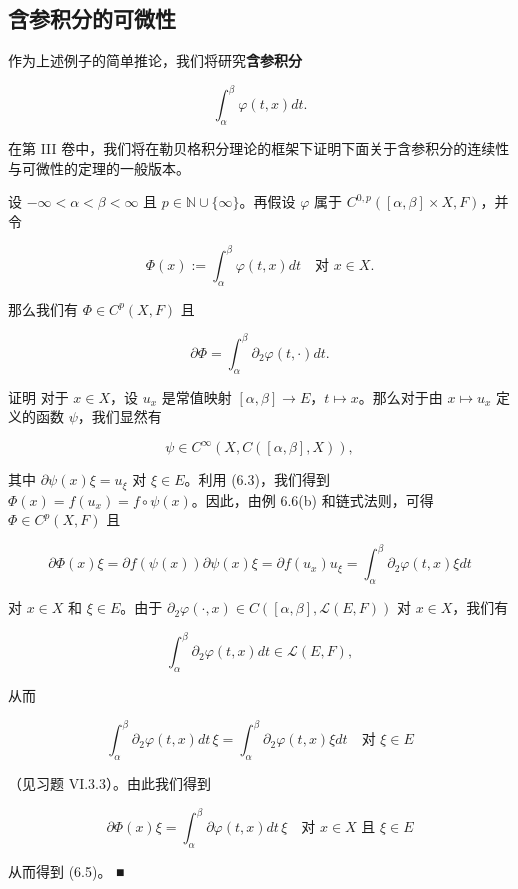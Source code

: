 \subsection*{含参积分的可微性}

作为上述例子的简单推论，我们将研究\textbf{含参积分}

\[
\int_{\alpha}^{\beta}\varphi(t, x) dt .
\]

在第 III 卷中，我们将在勒贝格积分理论的框架下证明下面关于含参积分的连续性与可微性的定理的一般版本。

\begin{proposition}

设 $ -\infty < \alpha < \beta < \infty $ 且 $ p \in \mathbb{N} \cup \{\infty\} $。再假设 $ \varphi $ 属于 $ C^{0,p}([\alpha, \beta] \times X, F) $，并令

\[
\Phi(x) := \int_{\alpha}^{\beta}\varphi(t, x) dt \quad \text{对 } x \in X .
\]

那么我们有 $ \Phi \in C^{p}(X, F) $ 且

\begin{equation}
\partial\Phi = \int_{\alpha}^{\beta}\partial_{2}\varphi(t, \cdot) dt .\tag{6.5}
\end{equation}

证明 对于 $ x \in X $，设 $ u_{x} $ 是常值映射 $ [\alpha, \beta] \to E $，$ t \mapsto x $。那么对于由 $ x \mapsto u_{x} $ 定义的函数 $ \psi $，我们显然有

\[
\psi \in C^{\infty}(X, C([\alpha, \beta], X)) ,
\]

其中 $ \partial\psi(x)\xi = u_{\xi} $ 对 $ \xi \in E $。利用 (6.3)，我们得到 $ \Phi(x) = f(u_{x}) = f \circ \psi(x) $。因此，由例 6.6(b) 和链式法则，可得 $ \Phi \in C^{p}(X, F) $ 且

\[
\partial\Phi(x)\xi = \partial f(\psi(x))\partial\psi(x)\xi = \partial f(u_{x})u_{\xi} = \int_{\alpha}^{\beta}\partial_{2}\varphi(t, x)\xi dt
\]

对 $ x \in X $ 和 $ \xi \in E $。由于 $ \partial_{2}\varphi(\cdot, x) \in C([\alpha, \beta], \mathcal{L}(E, F)) $ 对 $ x \in X $，我们有

\[
\int_{\alpha}^{\beta}\partial_{2}\varphi(t, x) dt \in \mathcal{L}(E, F) ,
\]

从而

\[
\int_{\alpha}^{\beta}\partial_{2}\varphi(t, x) dt\,\xi = \int_{\alpha}^{\beta}\partial_{2}\varphi(t, x)\xi dt \quad \text{对 } \xi \in E
\]

（见习题 VI.3.3）。由此我们得到

\[
\partial\Phi(x)\xi = \int_{\alpha}^{\beta}\partial\varphi(t, x) dt\,\xi \quad \text{对 } x \in X \text{ 且 } \xi \in E
\]

从而得到 (6.5)。 \nobreak\hspace{0.35em}■

\end{proposition}

